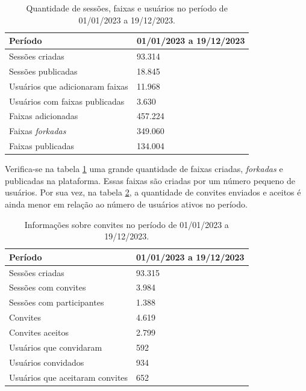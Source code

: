 \begin{table}[H]
  \centering
  \begin{tabular}{|l|l|}
    \hline
    \textbf{Período} & 01/01/2023 a 19/12/2023 \\ \hline
    Sessões criadas & 93.314 \\ \hline
    Sessões publicadas & 18.845 \\ \hline
    Usuários que adicionaram faixas & 11.968 \\ \hline
    Usuários com faixas publicadas & 3.630 \\ \hline
    Faixas adicionadas & 457.224 \\ \hline
    Faixas \textit{forkadas} & 349.060 \\ \hline
    Faixas publicadas & 134.004 \\ \hline
  \end{tabular}
  \caption{Quantidade de sessões, faixas e usuários no período de 01/01/2023 a 19/12/2023.}
  \label{tab_sessoes}
\end{table}

Verifica-se na tabela \ref{tab_sessoes} uma grande quantidade de faixas criadas,
\textit{forkadas} e publicadas na plataforma. Essas faixas são criadas por um
número pequeno de usuários. Por sua vez, na tabela \ref{tab_convites}, a
quantidade de convites enviados e aceitos é ainda menor em relação ao número de
usuários ativos no período.

\begin{table}[htbp]
  \centering
  \begin{tabular}{|l|l|}
    \hline
    \textbf{Período} & 01/01/2023 a 19/12/2023 \\ \hline
    Sessões criadas & 93.315 \\ \hline
    Sessões com convites & 3.984 \\ \hline
    Sessões com participantes & 1.388 \\ \hline
    Convites & 4.619 \\ \hline
    Convites aceitos & 2.799 \\ \hline
    Usuários que convidaram & 592 \\ \hline
    Usuários convidados & 934 \\ \hline
    Usuários que aceitaram convites & 652 \\ \hline
  \end{tabular}
  \caption{Informações sobre convites no período de 01/01/2023 a 19/12/2023.}
  \label{tab_convites}
\end{table}

